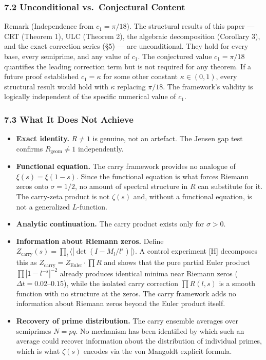 \documentclass[
  11pt,
]{article}
\providecommand{\tightlist}{%
  \setlength{\itemsep}{0pt}\setlength{\parskip}{0pt}}
\begin{document}
\subsubsection{7.2 Unconditional vs.~Conjectural
Content}\label{unconditional-vs.-conjectural-content}

Remark (Independence from \(c_1 = \pi/18\)). The structural results of this
paper --- CRT (Theorem 1), ULC (Theorem 2), the algebraic decomposition
(Corollary 3), and the exact correction series (§5) --- are unconditional. They
hold for every base, every semiprime, and any value of \(c_1\). The conjectured
value \(c_1 = \pi/18\) quantifies the leading correction term but is not
required for any theorem. If a future proof established \(c_1 = \kappa\) for
some other constant \(\kappa \in (0,1)\), every structural result would hold
with \(\kappa\) replacing \(\pi/18\). The framework's validity is logically
independent of the specific numerical value of \(c_1\).

\subsubsection{7.3 What It Does Not Achieve}\label{what-it-does-not-achieve}

\begin{itemize}
\tightlist
\item
  \textbf{Exact identity.} \(R \neq 1\) is genuine, not an artefact. The Jensen
  gap test confirms \(R_{\text{geom}} \neq 1\) independently.
\item
  \textbf{Functional equation.} The carry framework provides no analogue of
  \(\xi(s) = \xi(1-s)\). Since the functional equation is what forces Riemann
  zeros onto \(\sigma = 1/2\), no amount of spectral structure in \(R\) can
  substitute for it. The carry-zeta product is not \(\zeta(s)\) and, without a
  functional equation, is not a generalized \(L\)-function.
\item
  \textbf{Analytic continuation.} The carry product exists only for
  \(\sigma > 0\).
\item
  \textbf{Information about Riemann zeros.} Define
  \(Z_{\text{carry}}(s) = \prod_l \langle|\det(I - M_l/l^s)|\rangle\). A control
  experiment {[}H{]} decomposes this as
  \(Z_{\text{carry}} = Z_{\text{Euler}} \cdot \prod R\) and shows that the pure
  partial Euler product \(\prod |1-l^{-s}|^{-2}\) already produces identical
  minima near Riemann zeros (\(\Delta t = 0.02\)--\(0.15\)), while the isolated
  carry correction \(\prod R(l,s)\) is a smooth function with no structure at
  the zeros. The carry framework adds no information about Riemann zeros beyond
  the Euler product itself.
\item
  \textbf{Recovery of prime distribution.} The carry ensemble averages over
  semiprimes \(N = pq\). No mechanism has been identified by which such an
  average could recover information about the distribution of individual primes,
  which is what \(\zeta(s)\) encodes via the von Mangoldt explicit formula.
\end{itemize}
\end{document}
